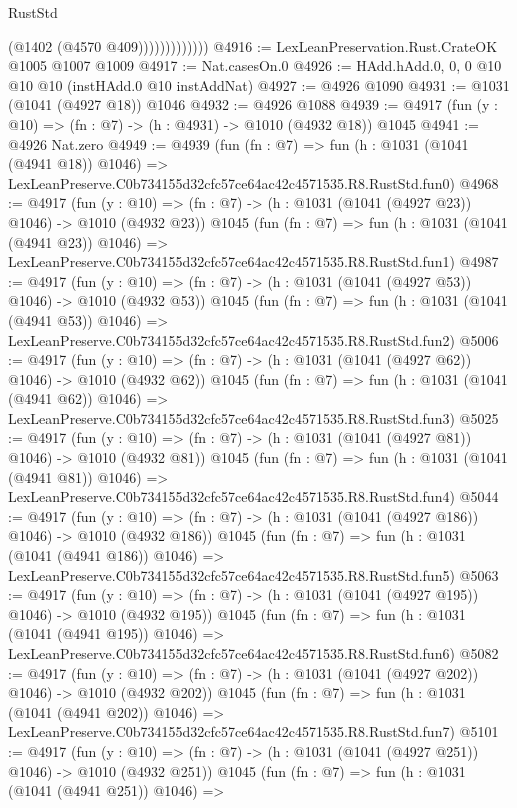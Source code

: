 \begin{lexlean}{RustStd}
\begin{coremodule}
                          (@1402 (@4570 @409)))))))))))))
@4916 := LexLeanPreservation.Rust.CrateOK @1005 @1007 @1009
@4917 := Nat.casesOn.{0}
@4926 := HAdd.hAdd.{0, 0, 0} @10 @10 @10 (instHAdd.{0} @10 instAddNat)
@4927 := @4926 @1090
@4931 := @1031 (@1041 (@4927 @18)) @1046
@4932 := @4926 @1088
@4939 := @4917 (fun (y : @10) => (fn : @7) -> (h : @4931) -> @1010 (@4932 @18)) @1045
@4941 := @4926 Nat.zero
@4949 := @4939
    (fun (fn : @7) =>
    fun (h : @1031 (@1041 (@4941 @18)) @1046) =>
    LexLeanPreserve.C0b734155d32cfc57ce64ac42c4571535.R8.RustStd.fun0)
@4968 := @4917
    (fun (y : @10) => (fn : @7) -> (h : @1031 (@1041 (@4927 @23)) @1046) -> @1010 (@4932 @23))
    @1045
    (fun (fn : @7) =>
    fun (h : @1031 (@1041 (@4941 @23)) @1046) =>
    LexLeanPreserve.C0b734155d32cfc57ce64ac42c4571535.R8.RustStd.fun1)
@4987 := @4917
    (fun (y : @10) => (fn : @7) -> (h : @1031 (@1041 (@4927 @53)) @1046) -> @1010 (@4932 @53))
    @1045
    (fun (fn : @7) =>
    fun (h : @1031 (@1041 (@4941 @53)) @1046) =>
    LexLeanPreserve.C0b734155d32cfc57ce64ac42c4571535.R8.RustStd.fun2)
@5006 := @4917
    (fun (y : @10) => (fn : @7) -> (h : @1031 (@1041 (@4927 @62)) @1046) -> @1010 (@4932 @62))
    @1045
    (fun (fn : @7) =>
    fun (h : @1031 (@1041 (@4941 @62)) @1046) =>
    LexLeanPreserve.C0b734155d32cfc57ce64ac42c4571535.R8.RustStd.fun3)
@5025 := @4917
    (fun (y : @10) => (fn : @7) -> (h : @1031 (@1041 (@4927 @81)) @1046) -> @1010 (@4932 @81))
    @1045
    (fun (fn : @7) =>
    fun (h : @1031 (@1041 (@4941 @81)) @1046) =>
    LexLeanPreserve.C0b734155d32cfc57ce64ac42c4571535.R8.RustStd.fun4)
@5044 := @4917
    (fun (y : @10) => (fn : @7) -> (h : @1031 (@1041 (@4927 @186)) @1046) -> @1010 (@4932 @186))
    @1045
    (fun (fn : @7) =>
    fun (h : @1031 (@1041 (@4941 @186)) @1046) =>
    LexLeanPreserve.C0b734155d32cfc57ce64ac42c4571535.R8.RustStd.fun5)
@5063 := @4917
    (fun (y : @10) => (fn : @7) -> (h : @1031 (@1041 (@4927 @195)) @1046) -> @1010 (@4932 @195))
    @1045
    (fun (fn : @7) =>
    fun (h : @1031 (@1041 (@4941 @195)) @1046) =>
    LexLeanPreserve.C0b734155d32cfc57ce64ac42c4571535.R8.RustStd.fun6)
@5082 := @4917
    (fun (y : @10) => (fn : @7) -> (h : @1031 (@1041 (@4927 @202)) @1046) -> @1010 (@4932 @202))
    @1045
    (fun (fn : @7) =>
    fun (h : @1031 (@1041 (@4941 @202)) @1046) =>
    LexLeanPreserve.C0b734155d32cfc57ce64ac42c4571535.R8.RustStd.fun7)
@5101 := @4917
    (fun (y : @10) => (fn : @7) -> (h : @1031 (@1041 (@4927 @251)) @1046) -> @1010 (@4932 @251))
    @1045
    (fun (fn : @7) =>
    fun (h : @1031 (@1041 (@4941 @251)) @1046) =>

\end{coremodule}
\end{lexlean}
